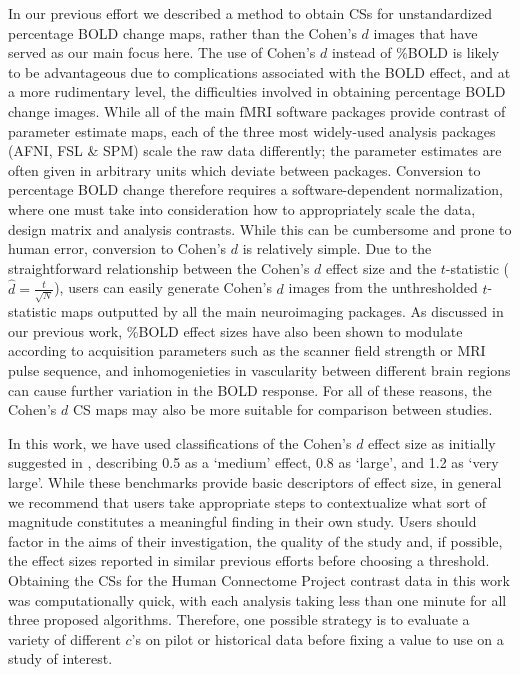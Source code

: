 In our previous effort we described a method to obtain CSs for unstandardized percentage BOLD change maps, rather than the Cohen's $d$ images that have served as our main focus here. The use of Cohen's $d$ instead of \%BOLD is likely to be advantageous due to complications associated with the BOLD effect, and at a more rudimentary level, the difficulties involved in obtaining percentage BOLD change images. While all of the main fMRI software packages provide contrast of parameter estimate maps, each of the three most widely-used analysis packages (AFNI, FSL \& SPM) scale the raw data differently; the parameter estimates are often given in arbitrary units which deviate between packages. Conversion to percentage BOLD change therefore requires a software-dependent normalization, where one must take into consideration how to appropriately scale the data, design matrix and analysis contrasts. While this can be cumbersome and prone to human error, conversion to Cohen's $d$ is relatively simple. Due to the straightforward relationship between the Cohen's $d$ effect size and the $t$-statistic \Big($\hat{d} = \frac{t}{\sqrt{N}}$\Big), users can easily generate Cohen's $d$ images from the unthresholded $t$-statistic maps outputted by all the main neuroimaging packages. As discussed in our previous work, \%BOLD effect sizes have also been shown to modulate according to acquisition parameters such as the scanner field strength or MRI pulse sequence, and inhomogenieties in vascularity between different brain regions can cause further variation in the BOLD response. For all of these reasons, the Cohen's $d$ CS maps may also be more suitable for comparison between studies. 

In this work, we have used classifications of the Cohen's $d$ effect size as initially suggested in \citet*{Cohen2013-it}, describing 0.5 as a `medium' effect, 0.8 as `large', and 1.2 as `very large'. While these benchmarks provide basic descriptors of effect size, in general we recommend that users take appropriate steps to contextualize what sort of magnitude constitutes a meaningful finding in their own study. Users should factor in the aims of their investigation, the quality of the study and, if possible, the effect sizes reported in similar previous efforts before choosing a threshold. Obtaining the CSs for the Human Connectome Project contrast data in this work was computationally quick, with each analysis taking less than one minute for all three proposed algorithms. Therefore, one possible strategy is to evaluate a variety of different $c$'s on pilot or historical data before fixing a value to use on a study of interest.

